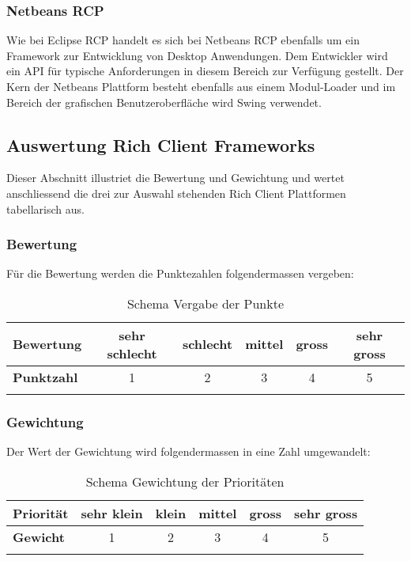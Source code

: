 \subsubsection{Netbeans RCP}
Wie bei Eclipse RCP handelt es sich bei Netbeans RCP ebenfalls um ein Framework zur Entwicklung von Desktop Anwendungen. Dem Entwickler wird ein API für typische Anforderungen in diesem Bereich zur Verfügung gestellt. Der Kern der Netbeans Plattform besteht ebenfalls aus einem Modul-Loader und im Bereich der grafischen Benutzeroberfläche wird Swing verwendet.

\subsection{Auswertung Rich Client Frameworks}
Dieser Abschnitt illustriet die Bewertung und Gewichtung und wertet anschliessend die drei zur Auswahl stehenden Rich Client Plattformen tabellarisch aus. 
\subsubsection{Bewertung}
Für die Bewertung werden die Punktezahlen  folgendermassen vergeben:
\begin{longtable}{|l|c|c|c|c|c|}\hline
 \textbf{Bewertung} & sehr schlecht & schlecht & mittel & gross & sehr gross\\\hline
 \textbf{Punktzahl} & 1 & 2 & 3 & 4 & 5\\\hline
 \caption{Schema Vergabe der Punkte}
\end{longtable}

\subsubsection{Gewichtung}
Der Wert der Gewichtung wird folgendermassen in eine Zahl umgewandelt: 
\begin{longtable}{|l|c|c|c|c|c|}\hline
 \textbf{Priorität} & sehr klein & klein & mittel & gross & sehr gross\\\hline
 \textbf{Gewicht} & 1 & 2 & 3 & 4 & 5\\\hline
 \caption{Schema Gewichtung der Prioritäten}
\end{longtable}


